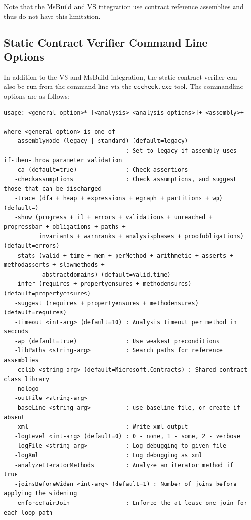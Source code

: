 \documentclass{article}
\newcommand{\code}[1]{\lstinline{#1}}
\begin{document}
Note that the MsBuild and VS integration use contract reference
assemblies and thus do not have this limitation.


\subsection{Static Contract Verifier Command Line Options}
\label{sec:staticverification}
In addition to the VS and MsBuild integration, the static contract
verifier can also be run from the command line via the
\code{cccheck.exe} tool.  The commandline options are as follows:

{\small
\begin{verbatim}
usage: <general-option>* [<analysis> <analysis-options>]+ <assembly>+

where <general-option> is one of
   -assemblyMode (legacy | standard) (default=legacy)
                                   : Set to legacy if assembly uses if-then-throw parameter validation
   -ca (default=true)              : Check assertions
   -checkassumptions               : Check assumptions, and suggest those that can be discharged
   -trace (dfa + heap + expressions + egraph + partitions + wp) (default=)
   -show (progress + il + errors + validations + unreached + progressbar + obligations + paths + 
          invariants + warnranks + analysisphases + proofobligations) (default=errors)
   -stats (valid + time + mem + perMethod + arithmetic + asserts + methodasserts + slowmethods +
           abstractdomains) (default=valid,time)
   -infer (requires + propertyensures + methodensures) (default=propertyensures)
   -suggest (requires + propertyensures + methodensures) (default=requires)
   -timeout <int-arg> (default=10) : Analysis timeout per method in seconds
   -wp (default=true)              : Use weakest preconditions
   -libPaths <string-arg>          : Search paths for reference assemblies
   -cclib <string-arg> (default=Microsoft.Contracts) : Shared contract class library
   -nologo                        
   -outFile <string-arg>          
   -baseLine <string-arg>          : use baseline file, or create if absent
   -xml                            : Write xml output
   -logLevel <int-arg> (default=0) : 0 - none, 1 - some, 2 - verbose
   -logFile <string-arg>           : Log debugging to given file
   -logXml                         : Log debugging as xml
   -analyzeIteratorMethods         : Analyze an iterator method if true
   -joinsBeforeWiden <int-arg> (default=1) : Number of joins before applying the widening
   -enforceFairJoin                : Enforce the at lease one join for each loop path

\end{verbatim}}
\end{document}
